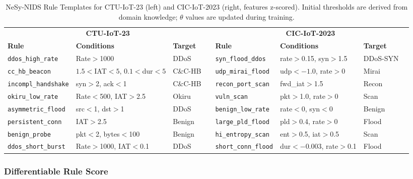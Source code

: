 \documentclass[conference]{IEEEtran}
\begin{document}
\begin{table}[!t]
\renewcommand{\arraystretch}{1.1}
\caption{NeSy-NIDS Rule Templates for CTU-IoT-23 (left) and CIC-IoT-2023 (right, features z-scored).
  Initial thresholds are derived from domain knowledge; $\theta$ values are updated during training.}
\label{tab:rules_ctu}
\label{tab:rules_cic}
\centering
\footnotesize
\begin{tabular}{llll@{\hspace{1.5em}}llll}
\toprule
\multicolumn{4}{c}{\textbf{CTU-IoT-23}} &
\multicolumn{4}{c}{\textbf{CIC-IoT-2023}} \\
\cmidrule(r){1-4}\cmidrule(l){5-8}
\textbf{Rule} & \textbf{Conditions} & \textbf{Target} & &
\textbf{Rule} & \textbf{Conditions} & \textbf{Target} & \\
\midrule
\texttt{ddos\_high\_rate}    & Rate$>$1000            & DDoS    &&
\texttt{syn\_flood\_ddos}    & rate$>$0.15, syn$>$1.5 & DDoS-SYN \\
\texttt{cc\_hb\_beacon}      & $1.5{<}$IAT$<5$, $0.1{<}$dur$<5$ & C\&C-HB &&
\texttt{udp\_mirai\_flood}   & udp$<{-}1.0$, rate$>$0 & Mirai \\
\texttt{incompl\_handshake}  & syn$>$2, ack$<$1       & C\&C-HB &&
\texttt{recon\_port\_scan}   & fwd\_iat$>$1.5         & Recon \\
\texttt{okiru\_low\_rate}    & Rate$<$500, IAT$>$2.5  & Okiru   &&
\texttt{vuln\_scan}          & pkt$>$1.0, rate$>$0    & Scan \\
\texttt{asymmetric\_flood}   & src$<$1, dst$>$1       & DDoS    &&
\texttt{benign\_low\_rate}   & rate$<$0, syn$<$0      & Benign \\
\texttt{persistent\_conn}    & IAT$>$2.5              & Benign  &&
\texttt{large\_pld\_flood}   & pld$>$0.4, rate$>$0    & Flood \\
\texttt{benign\_probe}       & pkt$<$2, bytes$<$100   & Benign  &&
\texttt{hi\_entropy\_scan}   & ent$>$0.5, iat$>$0.5   & Scan \\
\texttt{ddos\_short\_burst}  & Rate$>$1000, IAT$<$0.1 & DDoS    &&
\texttt{short\_conn\_flood}  & dur$<{-}0.003$, rate$>$0.1 & Flood \\
\bottomrule
\end{tabular}
\end{table}

\subsubsection{Differentiable Rule Score}
\end{document}
